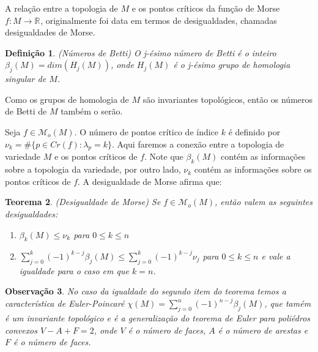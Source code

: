 \documentclass[12pt]{book}
\newtheorem{teorema}{Teorema}[section]
\newtheorem{definicao}[teorema]{Definição}
\newtheorem{observacao}[teorema]{Observação}
\newcommand{\funcoesmorse}[1]{\mathcal{M}_{o}(#1)}
\newcommand{\pontoscriticos}[1]{\textit{Cr}(#1)}
\newcommand{\real}[1]{\mathbb{R}^{#1}}
\newcommand{\reta}{\real{}}
\begin{document}
	A relação entre a topologia de $M$ e os pontos críticos da função de Morse $f:M \to \reta$, originalmente foi data em termos de desigualdades, chamadas desigualdades de Morse.
	
	\begin{definicao}
		(Números de Betti) O j-ésimo número de Betti é o inteiro $\beta_{j}(M) = dim(H_{j}(M))$, onde $H_{j}(M)$ é o j-ésimo grupo de homologia singular de $M$.
	\end{definicao}
	
	Como os grupos de homologia de $M$ são invariantes topológicos, então os números de Betti de $M$ também o serão.
	
	Seja $f \in \funcoesmorse{M}$. O número de pontos crítico de índice $k$ é definido por $\nu_{k} = \#\{p\in \pontoscriticos{f}: \lambda_{p} = k \}$. Aqui faremos a conexão entre a topologia de variedade $M$ e os pontos críticos de $f$. Note que $\beta_{k}(M)$ contém as informações sobre a topologia da variedade, por outro lado, $\nu_{k}$ contém as informações sobre os pontos críticos de $f$. A desigualdade de Morse afirma que:
	
	\begin{teorema}
		(Desigualdade de Morse) Se $f \in \funcoesmorse{M}$, então valem as seguintes desigualdades:
		\begin{enumerate}
			\item $\beta_{k}(M) \leq \nu_{k}$ para $0\leq k\leq n$
			
			\item $\sum_{j = 0}^{k}(-1)^{k-j}\beta_{j}(M) \leq \sum_{j = 0}^{k}(-1)^{k-j}\nu_{j} $ para $0 \leq k \leq n$ e vale a igualdade para o caso em que $k=n$.
		\end{enumerate}
	\end{teorema}
	
	\begin{observacao}
		No caso da igualdade do segundo item do teorema temos a característica de Euler-Poincaré $\chi(M) = \sum_{j = 0}^{n}(-1)^{n-j}\beta_{j}(M)$, que tamém é um invariante topológico e é a generalização do teorema de Euler para poliédros convexos $V-A+F = 2$, onde $V$ é o número de faces, $A$ é o número de arestas e $F$ é o número de faces.
	\end{observacao}
	
\end{document}
